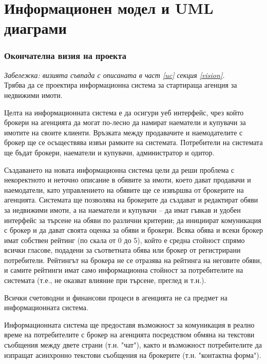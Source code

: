 \documentclass[a4paper]{article}
\begin{document}
\part{Информационен модел и UML диаграми}
\setcounter{section}{0}
\setcounter{figure}{0}

\section{Окончателна визия на проекта}

\emph{Забележка: визията съвпада с описаната в част \ref{uc} секция \ref{vision}.} \\

Трябва да се проектира информационна система за стартираща агенция за недвижими имоти. 

Целта на информационната система е да осигури уеб интерфейс, чрез който брокери на агенцията да могат по-лесно да намират наематели и купувачи за имотите на своите клиенти. Връзката между продавачите и наемодателите с брокер ще се осъществява извън рамките на системата. Потребители на системата ще бъдат брокери, наематели и купувачи, администратор и одитор.

Създаването на новата информационна система цели да реши проблема с некоректното и неточно описание в обявите за имоти, което дават продавачи и наемодатели, като управлението на обявите ще се извършва от брокерите на агенцията. Системата ще позволява на брокерите да създават и редактират обяви за недвижими имоти, а на наематели и купувачи – да имат гъвкав и удобен интерфейс за търсене на обяви по различни критерии; да инициират комуникация с брокер и да дават своята оценка за обяви и брокери. Всяка обява и всеки брокер имат собствен рейтинг (по скала от 0 до 5), който е средна стойност спрямо всички гласове, подадени за съответната обява или брокер от регистрирани потребители. Рейтингът на брокера не се отразява на рейтинга на неговите обяви, и самите рейтинги имат само информационна стойност за потребителите на системата (т.е., не оказват влияние при търсене, преглед и т.н.).

Всички счетоводни и финансови процеси в агенцията не са предмет на информационната система.

Информационната система ще предоставя възможност за комуникация в реално време на потребителите с брокер на агенцията посредством обмяна на текстови съобщения между двете страни (т.н. "чат"), както и възможност потребителите да изпращат асинхронно текстови съобщения на брокерите (т.н. "контактна форма").
\end{document}

